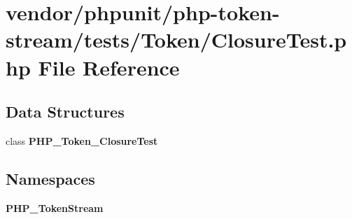 \section{vendor/phpunit/php-\/token-\/stream/tests/\+Token/\+Closure\+Test.php File Reference}
\label{_closure_test_8php}
\subsection*{Data Structures}
\begin{DoxyCompactItemize}
\item 
class {\bf P\+H\+P\+\_\+\+Token\+\_\+\+Closure\+Test}
\end{DoxyCompactItemize}
\subsection*{Namespaces}
\begin{DoxyCompactItemize}
\item 
 {\bf P\+H\+P\+\_\+\+Token\+Stream}
\end{DoxyCompactItemize}
